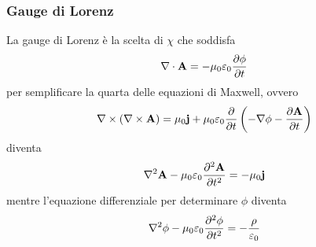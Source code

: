\documentclass{article}
\begin{document}
\subsubsection*{Gauge di Lorenz}
La gauge di Lorenz è la scelta di $\chi$ che soddisfa 
\begin{align}
    \nabla \cdot \mathbf{A} = -\mu_0\varepsilon_0\frac{\partial\phi}{\partial t} \notag
\end{align}
per semplificare la quarta delle equazioni di Maxwell, ovvero 
\begin{align}
    \nabla \times (\nabla \times \mathbf{A}) = \mu_0\mathbf{j} + \mu_0\varepsilon_0\frac{\partial}{\partial t}\left(-\nabla\phi - \frac{\partial \mathbf{A}}{\partial t}\right) \notag 
\end{align}
diventa 
\begin{align}
    \nabla^2\mathbf{A} - \mu_0\varepsilon_0\frac{\partial^2\mathbf{A}}{\partial t^2} = -\mu_0\mathbf{j} \notag
\end{align}
mentre l'equazione differenziale per determinare $\phi$ diventa 
\begin{align}
    \nabla^2\phi - \mu_0\varepsilon_0\frac{\partial^2\phi}{\partial t^2} = -\frac{\rho}{\varepsilon_0} \notag
\end{align}
\end{document}
